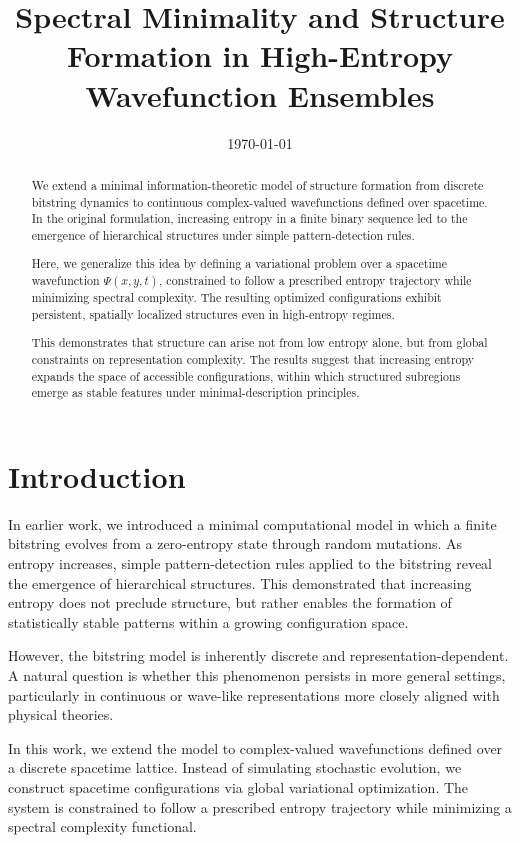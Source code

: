 \documentclass[11pt]{article}
\title{Spectral Minimality and Structure Formation in High-Entropy Wavefunction Ensembles}
\date{\today}
\begin{document}
\maketitle

\begin{abstract}
We extend a minimal information-theoretic model of structure formation from discrete bitstring dynamics to continuous complex-valued wavefunctions defined over spacetime. In the original formulation, increasing entropy in a finite binary sequence led to the emergence of hierarchical structures under simple pattern-detection rules. 

Here, we generalize this idea by defining a variational problem over a spacetime wavefunction $\Psi(x,y,t)$, constrained to follow a prescribed entropy trajectory while minimizing spectral complexity. The resulting optimized configurations exhibit persistent, spatially localized structures even in high-entropy regimes.

This demonstrates that structure can arise not from low entropy alone, but from global constraints on representation complexity. The results suggest that increasing entropy expands the space of accessible configurations, within which structured subregions emerge as stable features under minimal-description principles.
\end{abstract}


\section{Introduction}

In earlier work, we introduced a minimal computational model in which a finite bitstring evolves from a zero-entropy state through random mutations. As entropy increases, simple pattern-detection rules applied to the bitstring reveal the emergence of hierarchical structures. This demonstrated that increasing entropy does not preclude structure, but rather enables the formation of statistically stable patterns within a growing configuration space.

However, the bitstring model is inherently discrete and representation-dependent. A natural question is whether this phenomenon persists in more general settings, particularly in continuous or wave-like representations more closely aligned with physical theories.

In this work, we extend the model to complex-valued wavefunctions defined over a discrete spacetime lattice. Instead of simulating stochastic evolution, we construct spacetime configurations via global variational optimization. The system is constrained to follow a prescribed entropy trajectory while minimizing a spectral complexity functional.
\end{document}
